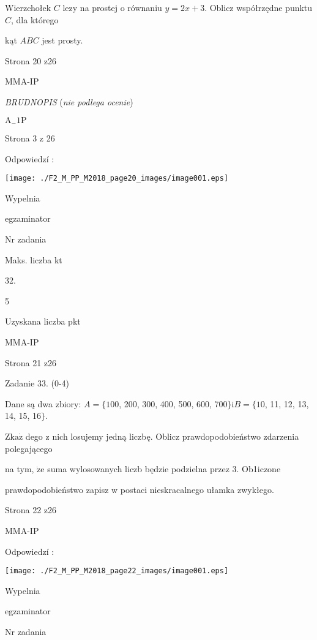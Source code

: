 \documentclass[a4paper,12pt]{article}
\begin{document}
Wierzchołek $C$ lezy na prostej o równaniu $y=2x+3$. Oblicz współrzędne punktu $C$, dla którego

kąt $ABC$ jest prosty.

Strona 20 z26

MMA-IP





{\it BRUDNOPIS} ({\it nie podlega ocenie})

$\mathrm{A}_{-}1\mathrm{P}$

Strona 3 z 26





Odpowiedzí :
\begin{center}
\texttt{[image: ./F2\_M\_PP\_M2018\_page20\_images/image001.eps]}
\end{center}
Wypelnia

egzaminator

Nr zadania

Maks. liczba kt

32.

5

Uzyskana liczba pkt

MMA-IP

Strona 21 z26





Zadanie 33. (0-4)

Dane są dwa zbiory: $A=\{100$, 200, 300, 400, 500, 600, 700$\} \mathrm{i} B=\{10$, 11, 12, 13, 14, 15, 16$\}.$

$\mathrm{Z}\mathrm{k}\mathrm{a}\dot{\mathrm{z}}$ dego z nich losujemy jedną liczbę. Oblicz prawdopodobieństwo zdarzenia polegającego

na tym, $\dot{\mathrm{z}}\mathrm{e}$ suma wylosowanych liczb będzie podzielna przez 3. Ob1iczone

prawdopodobieństwo zapisz w postaci nieskracalnego ułamka zwykłego.

Strona 22 z26

MMA-IP





Odpowiedzí :
\begin{center}
\texttt{[image: ./F2\_M\_PP\_M2018\_page22\_images/image001.eps]}
\end{center}
Wypelnia

egzaminator

Nr zadania
\end{document}
